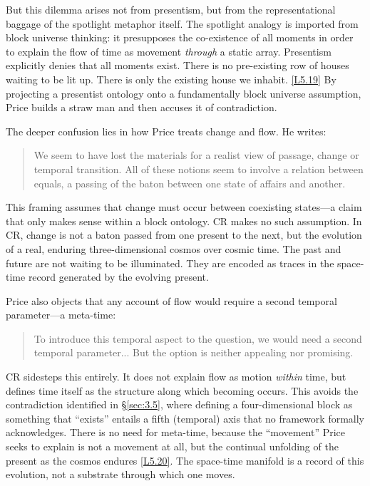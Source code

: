 \documentclass[12pt]{book}
\newcounter{logicanchor}
\newenvironment{logicanchorenv}[1]{\refstepcounter{logicanchor}\label{#1}}{}
\newcommand{\logiclink}[2]{\begin{logicanchorenv}{logic:#1}\end{logicanchorenv}\hyperref[appendix:#1]{[#1]}\xspace}
\begin{document}
But this dilemma arises not from presentism, but from the representational baggage of the spotlight metaphor itself. The spotlight analogy is imported from block universe thinking: it presupposes the co-existence of all moments in order to explain the flow of time as movement \textit{through} a static array. Presentism explicitly denies that all moments exist. There is no pre-existing row of houses waiting to be lit up. There is only the existing house we inhabit. \logiclink{L5.19}{} By projecting a presentist ontology onto a fundamentally block universe assumption, Price builds a straw man and then accuses it of contradiction.

The deeper confusion lies in how Price treats change and flow. He writes:
\begin{quote}
We seem to have lost the materials for a realist view of passage, change or temporal transition. All of these notions seem to involve a relation between equals, a passing of the baton between one state of affairs and another.
\end{quote}

This framing assumes that change must occur between coexisting states---a claim that only makes sense within a block ontology. CR makes no such assumption. In CR, change is not a baton passed from one present to the next, but the evolution of a real, enduring three-dimensional cosmos over cosmic time. The past and future are not waiting to be illuminated. They are encoded as traces in the space-time record generated by the evolving present.

Price also objects that any account of flow would require a second temporal parameter---a meta-time:
\begin{quote}
To introduce this temporal aspect to the question, we would need a second temporal parameter... But the option is neither appealing nor promising.
\end{quote}

CR sidesteps this entirely. It does not explain flow as motion \textit{within} time, but defines time itself as the structure along which becoming occurs. This avoids the contradiction identified in \S\ref{sec:3.5}, where defining a four-dimensional block as something that ``exists'' entails a fifth (temporal) axis that no framework formally acknowledges. There is no need for meta-time, because the ``movement'' Price seeks to explain is not a movement at all, but the continual unfolding of the present as the cosmos endures \logiclink{L5.20}{}. The space-time manifold is a record of this evolution, not a substrate through which one moves.
\end{document}
